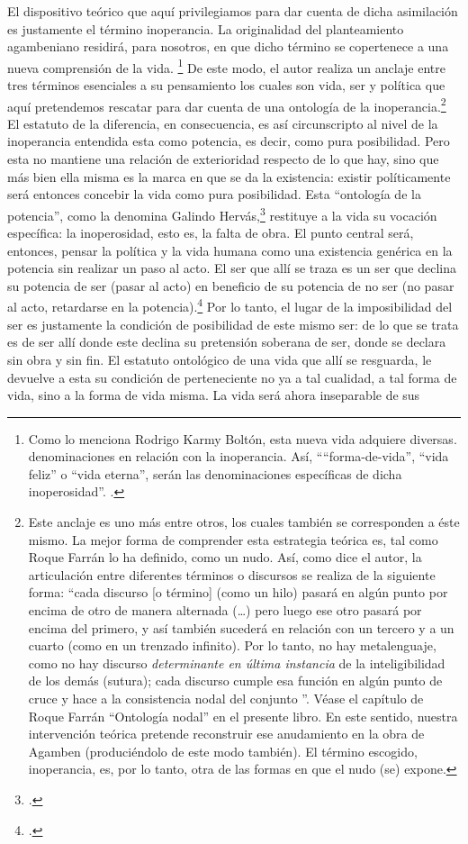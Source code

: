 El dispositivo teórico que aquí privilegiamos para dar cuenta de dicha asimilación es justamente el término inoperancia. La originalidad del planteamiento agambeniano residirá, para nosotros, en que dicho término se copertenece a una nueva comprensión de la vida. \footnote{Como lo menciona Rodrigo Karmy Boltón, esta nueva vida adquiere diversas. denominaciones en relación con la inoperancia. Así, \enquote{“forma-de-vida”, “vida feliz” o “vida eterna”, serán las denominaciones específicas de dicha inoperosidad}. \cite{@7089-KARMYBOLTON2010}.} De este modo, el autor realiza un anclaje entre tres términos esenciales a su pensamiento los cuales son vida, ser y política que aquí pretendemos rescatar para dar cuenta de una ontología de la inoperancia.\footnote{Este anclaje es uno más entre otros, los cuales también se corresponden a éste mismo. La mejor forma de comprender esta estrategia teórica es, tal como Roque Farrán lo ha definido, como un nudo. Así, como dice el autor, la articulación entre diferentes términos o discursos se realiza de la siguiente forma: \enquote{cada discurso [o término] (como un hilo) pasará en algún punto por encima de otro de manera alternada (\ldots) pero luego ese otro pasará por encima del primero, y así también sucederá en relación con un tercero y a un cuarto (como en un trenzado infinito). Por lo tanto, no hay metalenguaje, como no hay discurso \textit{determinante en última instancia} de la inteligibilidad de los demás (sutura); cada discurso cumple esa función en algún punto de cruce y hace a la consistencia nodal del conjunto }. Véase el capítulo de Roque Farrán \enquote{Ontología nodal} en el presente libro. En este sentido, nuestra intervención teórica pretende reconstruir ese anudamiento en la obra de Agamben (produciéndolo de este modo también). El término escogido, inoperancia, es, por lo tanto, otra de las formas en que el nudo (se) expone.} El estatuto de la diferencia, en consecuencia, es así circunscripto al nivel de la inoperancia entendida esta como potencia, es decir, como pura posibilidad. Pero esta no mantiene una relación de exterioridad respecto de lo que hay, sino que más bien ella misma es la marca en que se da la existencia: existir políticamente será entonces concebir la vida como pura posibilidad. Esta \enquote{ontología de la potencia}, como la denomina Galindo Hervás,\footcite[205]{@7088-GALINDOHERVAS2003} restituye a la vida su vocación específica: la inoperosidad, esto es, la falta de obra. El punto central será, entonces, pensar la política y la vida humana como una existencia genérica en la potencia sin realizar un paso al acto. El ser que allí se traza es un ser que declina su potencia de ser (pasar al acto) en beneficio de su potencia de no ser (no pasar al acto, retardarse en la potencia).\footcite[205]{@7088-GALINDOHERVAS2003} Por lo tanto, el lugar de la imposibilidad del ser  es justamente la condición de posibilidad de este mismo ser: de lo que se trata es de ser allí donde este declina su pretensión soberana de ser, donde se declara sin obra y sin fin. El estatuto ontológico de una vida que allí se resguarda, le devuelve a esta su condición de perteneciente no ya a tal cualidad, a tal forma de vida, sino a la forma de vida misma. La vida será ahora inseparable de sus 